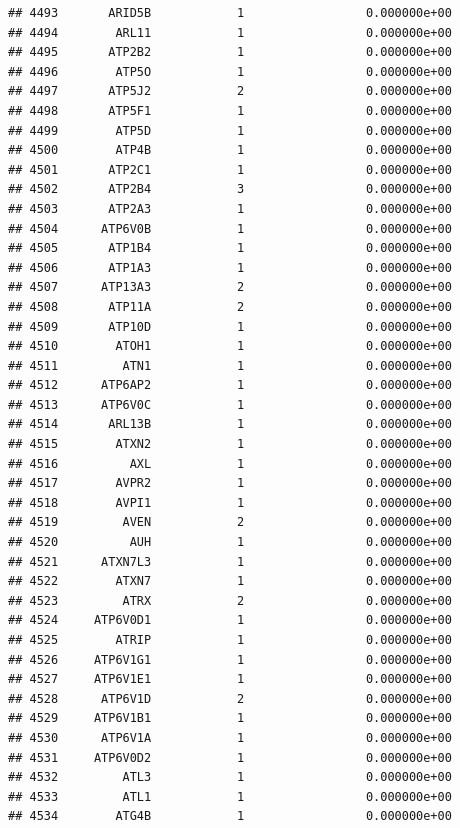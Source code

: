 \documentclass[
]{article}
\begin{document}
\begin{verbatim}
## 4493       ARID5B            1                 0.000000e+00
## 4494        ARL11            1                 0.000000e+00
## 4495       ATP2B2            1                 0.000000e+00
## 4496        ATP5O            1                 0.000000e+00
## 4497       ATP5J2            2                 0.000000e+00
## 4498       ATP5F1            1                 0.000000e+00
## 4499        ATP5D            1                 0.000000e+00
## 4500        ATP4B            1                 0.000000e+00
## 4501       ATP2C1            1                 0.000000e+00
## 4502       ATP2B4            3                 0.000000e+00
## 4503       ATP2A3            1                 0.000000e+00
## 4504      ATP6V0B            1                 0.000000e+00
## 4505       ATP1B4            1                 0.000000e+00
## 4506       ATP1A3            1                 0.000000e+00
## 4507      ATP13A3            2                 0.000000e+00
## 4508       ATP11A            2                 0.000000e+00
## 4509       ATP10D            1                 0.000000e+00
## 4510        ATOH1            1                 0.000000e+00
## 4511         ATN1            1                 0.000000e+00
## 4512      ATP6AP2            1                 0.000000e+00
## 4513      ATP6V0C            1                 0.000000e+00
## 4514       ARL13B            1                 0.000000e+00
## 4515        ATXN2            1                 0.000000e+00
## 4516          AXL            1                 0.000000e+00
## 4517        AVPR2            1                 0.000000e+00
## 4518        AVPI1            1                 0.000000e+00
## 4519         AVEN            2                 0.000000e+00
## 4520          AUH            1                 0.000000e+00
## 4521      ATXN7L3            1                 0.000000e+00
## 4522        ATXN7            1                 0.000000e+00
## 4523         ATRX            2                 0.000000e+00
## 4524     ATP6V0D1            1                 0.000000e+00
## 4525        ATRIP            1                 0.000000e+00
## 4526     ATP6V1G1            1                 0.000000e+00
## 4527     ATP6V1E1            1                 0.000000e+00
## 4528      ATP6V1D            2                 0.000000e+00
## 4529     ATP6V1B1            1                 0.000000e+00
## 4530      ATP6V1A            1                 0.000000e+00
## 4531     ATP6V0D2            1                 0.000000e+00
## 4532         ATL3            1                 0.000000e+00
## 4533         ATL1            1                 0.000000e+00
## 4534        ATG4B            1                 0.000000e+00

\end{verbatim}
\end{document}
